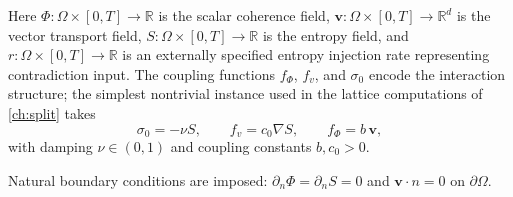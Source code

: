 \documentclass[12pt, oneside]{memoir}
\newcommand{\bv}{\mathbf{v}}
\begin{document}
Here $\Phi : \Omega \times [0,T] \to \mathbb{R}$ is the scalar coherence field,
$\bv : \Omega \times [0,T] \to \mathbb{R}^d$ is the vector transport field,
$S : \Omega \times [0,T] \to \mathbb{R}$ is the entropy field, and
$r : \Omega \times [0,T] \to \mathbb{R}$ is an externally specified entropy injection
rate representing contradiction input.  The coupling functions $f_\Phi$, $f_v$, and
$\sigma_0$ encode the interaction structure; the simplest nontrivial instance used in the
lattice computations of \cref{ch:split} takes
\begin{equation}
  \sigma_0 = -\nu S, \qquad f_v = c_0 \nabla S, \qquad f_\Phi = b\, \bv,
\end{equation}
with damping $\nu \in (0,1)$ and coupling constants $b, c_0 > 0$.

Natural boundary conditions are imposed: $\partial_n \Phi = \partial_n S = 0$ and
$\bv \cdot n = 0$ on $\partial\Omega$.
\end{document}
